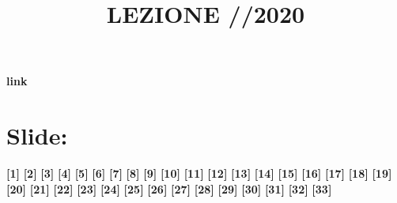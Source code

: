 \title{LEZIONE //2020}\newline
\textbf{link} \url{}
\section*{Slide: }
\textbf{[1]}\;
\newline\textbf{[2]}\;
\newline\textbf{[3]}\;
\newline\textbf{[4]}\;
\newline\textbf{[5]}\;
\newline\textbf{[6]}\;
\newline\textbf{[7]}\;
\newline\textbf{[8]}\;
\newline\textbf{[9]}\;
\newline\textbf{[10]}\;
\newline\textbf{[11]}\;
\newline\textbf{[12]}\;
\newline\textbf{[13]}\;
\newline\textbf{[14]}\;
\newline\textbf{[15]}\;
\newline\textbf{[16]}\;
\newline\textbf{[17]}\;
\newline\textbf{[18]}\;
\newline\textbf{[19]}\;
\newline\textbf{[20]}\;
\newline\textbf{[21]}\;
\newline\textbf{[22]}\;
\newline\textbf{[23]}\;
\newline\textbf{[24]}\;
\newline\textbf{[25]}\;
\newline\textbf{[26]}\;
\newline\textbf{[27]}\;
\newline\textbf{[28]}\;
\newline\textbf{[29]}\;
\newline\textbf{[30]}\;
\newline\textbf{[31]}\;
\newline\textbf{[32]}\;
\newline\textbf{[33]}\;